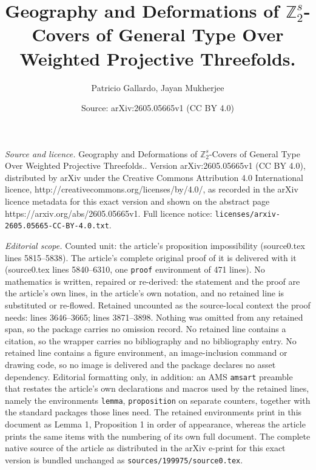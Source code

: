 \documentclass[10pt,a4paper]{amsart}
\title{Geography and Deformations of $\mathbb{Z}_2^s$-Covers of General Type Over Weighted Projective Threefolds.}
\author{Patricio Gallardo, Jayan Mukherjee}
\date{Source: arXiv:2605.05665v1 (CC BY 4.0)}
\begin{document}
\maketitle

\noindent\emph{Source and licence.} Geography and Deformations of $\mathbb{Z}_2^s$-Covers of General Type Over Weighted Projective Threefolds.. Version arXiv:2605.05665v1 (CC BY 4.0), distributed by arXiv under the Creative Commons Attribution 4.0 International licence, http://creativecommons.org/licenses/by/4.0/, as recorded in the arXiv licence metadata for this exact version and shown on the abstract page https://arxiv.org/abs/2605.05665v1. Full licence notice: \texttt{licenses/arxiv-2605.05665-CC-BY-4.0.txt}.\par\smallskip

\noindent\textit{Editorial scope.} Counted unit: the article's proposition impossibility (source0.tex lines 5815--5838). The article's complete original proof of it is delivered with it (source0.tex lines 5840--6310, one \texttt{proof} environment of 471 lines). No mathematics is written, repaired or re-derived: the statement and the proof are the article's own lines, in the article's own notation, and no retained line is substituted or re-flowed.  Retained uncounted as the source-local context the proof needs: lines 3646--3665; lines 3871--3898.  Nothing was omitted from any retained span, so the package carries no omission record.  No retained line contains a citation, so the wrapper carries no bibliography and no bibliography entry.  No retained line contains a figure environment, an image-inclusion command or drawing code, so no image is delivered and the package declares no asset dependency.  Editorial formatting only, in addition: an AMS \texttt{amsart} preamble that restates the article's own declarations and macros used by the retained lines, namely the environments \texttt{lemma}, \texttt{proposition} on separate counters, together with the standard packages those lines need.  The retained environments print in this document as Lemma 1, Proposition 1 in order of appearance, whereas the article prints the same items with the numbering of its own full document.  The complete native source of the article as distributed in the arXiv e-print for this exact version is bundled unchanged as \texttt{sources/199975/source0.tex}.
\end{document}
